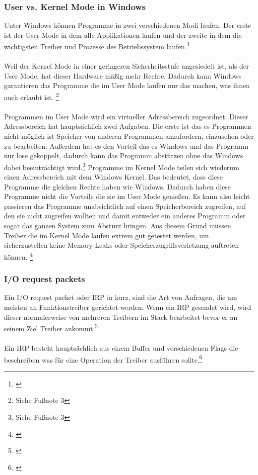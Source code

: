 \subsubsection{User vs. Kernel Mode in Windows}
Unter Windows können Programme in zwei verschiedenen Modi laufen. Der erste ist der User Mode in dem alle Applikationen laufen und der zweite in dem die wichtigsten Treiber und Prozesse des Betriebssystem laufen.\footnote[3]{\cite[Vgl.][]{21}}
\\\\
Weil der Kernel Mode in einer geringeren Sicherheitsstufe angesiedelt ist, als der User Mode, hat dieser Hardware mäßig mehr Rechte. Dadurch kann Windows garantieren das Programme die im User Mode laufen nur das machen, was ihnen auch erlaubt ist. \footnote[4]{Siehe Fußnote 3}
\\\\
Programmen im User Mode wird ein virtueller Adressbereich zugeordnet. Dieser Adressbereich hat hauptsächlich zwei Aufgaben. Die erste ist das es Programmen nicht möglich ist Speicher von anderen Programmen anzufordern, einzusehen oder zu bearbeiten. Außerdem hat es den Vorteil das es Windows und das Programm nur lose gekoppelt, dadurch kann das Programm abstürzen ohne das Windows dabei beeinträchtigt wird.\footnote[5]{Siehe Fußnote 3}
\newpage
Programme im Kernel Mode teilen sich wiederum einen Adressbereich mit dem Windows Kernel. Das bedeutet, dass diese Programme die gleichen Rechte haben wie Windows. Dadurch haben diese Programme nicht die Vorteile die sie im User Mode genießen. Es kann also leicht passieren das Programme unabsichtlich auf einen Speicherbereich zugreifen, auf den sie nicht zugreifen wollten und damit entweder ein anderes Programm oder sogar das ganzen System zum Absturz bringen. Aus diesem Grund müssen Treiber die im Kernel Mode laufen extrem gut getestet werden, um sicherzustellen keine Memory Leaks oder Speicherzugriffsverletzung auftreten können. \footnote[1]{\cite[Vgl.][]{21}}

\subsubsection{I/O request packets}
Ein I/O request packet oder IRP in kurz, sind die Art von Anfragen, die am meisten an Funktionstreiber gerichtet werden. Wenn ein IRP gesendet wird, wird dieser normalerweise von mehreren Treibern im Stack bearbeitet bevor er an seinem Ziel Treiber ankommt.\footnote[2]{\cite[Vgl.][]{23}}
\\\\
Ein IRP besteht hauptsächlich aus einem Buffer und verschiedenen Flags die beschreiben was für eine Operation der Treiber ausführen sollte.\footnote[3]{\cite[Vgl.][]{22}}

